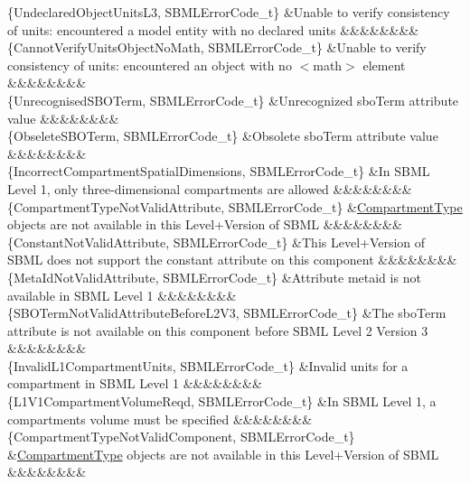 \begin{DoxyParagraph}{}
\begin{longtabu}
\{Undeclared\+Object\+Units\+L3, S\+B\+M\+L\+Error\+Code\+\_\+t\} &Unable to verify consistency of units\+: encountered a model entity with no declared units &&&&&&&&\\
\{Cannot\+Verify\+Units\+Object\+No\+Math, S\+B\+M\+L\+Error\+Code\+\_\+t\} &Unable to verify consistency of units\+: encountered an object with no {\ttfamily $<$math$>$} element &&&&&&&&\\
\{Unrecognised\+S\+B\+O\+Term, S\+B\+M\+L\+Error\+Code\+\_\+t\} &Unrecognized \textquotesingle{}sbo\+Term\textquotesingle{} attribute value &&&&&&&&\\
\{Obselete\+S\+B\+O\+Term, S\+B\+M\+L\+Error\+Code\+\_\+t\} &Obsolete \textquotesingle{}sbo\+Term\textquotesingle{} attribute value &&&&&&&&\\
\{Incorrect\+Compartment\+Spatial\+Dimensions, S\+B\+M\+L\+Error\+Code\+\_\+t\} &In S\+B\+ML Level 1, only three-\/dimensional compartments are allowed &&&&&&&&\\
\{Compartment\+Type\+Not\+Valid\+Attribute, S\+B\+M\+L\+Error\+Code\+\_\+t\} &\hyperlink{class_compartment_type}{Compartment\+Type} objects are not available in this Level+\+Version of S\+B\+ML &&&&&&&&\\
\{Constant\+Not\+Valid\+Attribute, S\+B\+M\+L\+Error\+Code\+\_\+t\} &This Level+\+Version of S\+B\+ML does not support the \textquotesingle{}constant\textquotesingle{} attribute on this component &&&&&&&&\\
\{Meta\+Id\+Not\+Valid\+Attribute, S\+B\+M\+L\+Error\+Code\+\_\+t\} &Attribute \textquotesingle{}metaid\textquotesingle{} is not available in S\+B\+ML Level 1 &&&&&&&&\\
\{S\+B\+O\+Term\+Not\+Valid\+Attribute\+Before\+L2\+V3, S\+B\+M\+L\+Error\+Code\+\_\+t\} &The \textquotesingle{}sbo\+Term\textquotesingle{} attribute is not available on this component before S\+B\+ML Level 2 Version 3 &&&&&&&&\\
\{Invalid\+L1\+Compartment\+Units, S\+B\+M\+L\+Error\+Code\+\_\+t\} &Invalid units for a compartment in S\+B\+ML Level 1 &&&&&&&&\\
\{L1\+V1\+Compartment\+Volume\+Reqd, S\+B\+M\+L\+Error\+Code\+\_\+t\} &In S\+B\+ML Level 1, a compartment\textquotesingle{}s volume must be specified &&&&&&&&\\
\{Compartment\+Type\+Not\+Valid\+Component, S\+B\+M\+L\+Error\+Code\+\_\+t\} &\hyperlink{class_compartment_type}{Compartment\+Type} objects are not available in this Level+\+Version of S\+B\+ML &&&&&&&&\\

\end{longtabu}
\end{DoxyParagraph}
